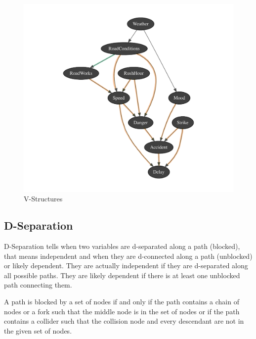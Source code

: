 \documentclass[a4paper,12pt]{article} %
\begin{document}
\begin{figure}[H]
	\centering
	\includegraphics[width=\linewidth]{../code/network-vstructures.pdf}	
	\caption{V-Structures}
	\label{fig:vstructure}
\end{figure}

\subsection*{D-Separation}
D-Separation tells when two variables are d-separated along a path (blocked), that means independent and when they are d-connected along a path (unblocked) or likely dependent.
They are actually independent if they are d-separated along all possible paths.
They are likely dependent if there is at least one unblocked path connecting them.

A path is blocked by a set of nodes if and only if the path contains a chain of nodes or a fork such that the middle node is in the set of nodes or if the path contains a collider such that the collision node and every descendant are not in the given set of nodes. 
\end{document}
